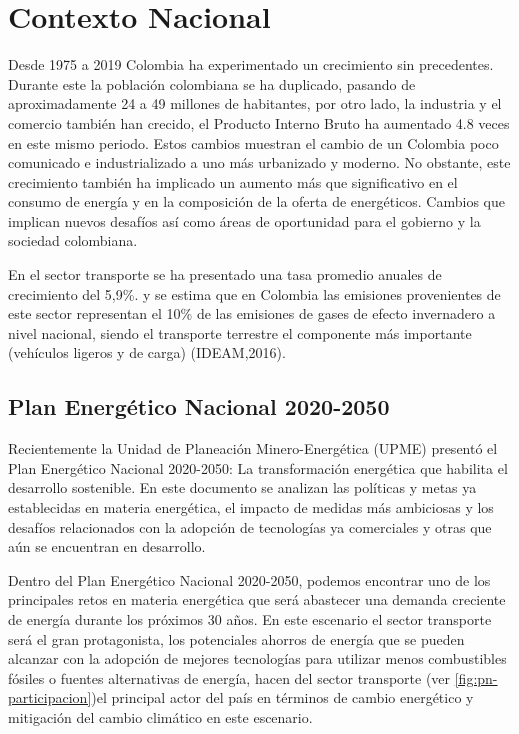 \chapter{Contexto Nacional}

Desde 1975 a 2019 Colombia ha experimentado un crecimiento sin precedentes. Durante este la población colombiana se ha duplicado, pasando de aproximadamente 24 a 49 millones de habitantes, por otro lado, la industria y el comercio también han crecido, el Producto Interno Bruto ha aumentado 4.8 veces en este mismo periodo. Estos cambios muestran el cambio de un Colombia poco comunicado e industrializado a uno más urbanizado y moderno. No obstante, este crecimiento también ha implicado un aumento más que significativo en el consumo de energía y en la composición de la oferta de energéticos. Cambios que implican nuevos desafíos así como áreas de oportunidad para el gobierno y la sociedad colombiana. 

En el sector transporte se ha presentado una tasa promedio anuales de crecimiento del  5,9\%. \cite{Plan_Energetico-2050} y se estima que en Colombia las emisiones provenientes de este sector representan el 10\% de las emisiones de gases de efecto invernadero a nivel nacional, siendo el transporte terrestre el componente más importante (vehículos ligeros y de carga) (IDEAM,2016). \cite{InformeFinal_WRI}

\section{Plan Energético Nacional 2020-2050}

Recientemente la Unidad de Planeación Minero-Energética (UPME) presentó el Plan Energético Nacional 2020-2050: La transformación energética que habilita el desarrollo sostenible. En este documento se analizan las políticas y metas ya establecidas en materia energética, el impacto de medidas más ambiciosas y los desafíos relacionados con la adopción de tecnologías ya comerciales y otras que aún se encuentran en desarrollo.

Dentro del Plan Energético Nacional 2020-2050, podemos encontrar uno de los principales retos en materia energética que será abastecer una demanda creciente de energía durante los próximos 30 años. En este escenario el sector transporte será el gran protagonista, los potenciales ahorros de energía que se pueden alcanzar con la adopción de mejores tecnologías para utilizar menos combustibles fósiles o fuentes alternativas de energía, hacen del sector transporte (ver \ref{fig:pn-participacion})el principal actor del país en términos de cambio energético y mitigación del cambio climático en este escenario. \cite{Plan_Energetico-2050}

